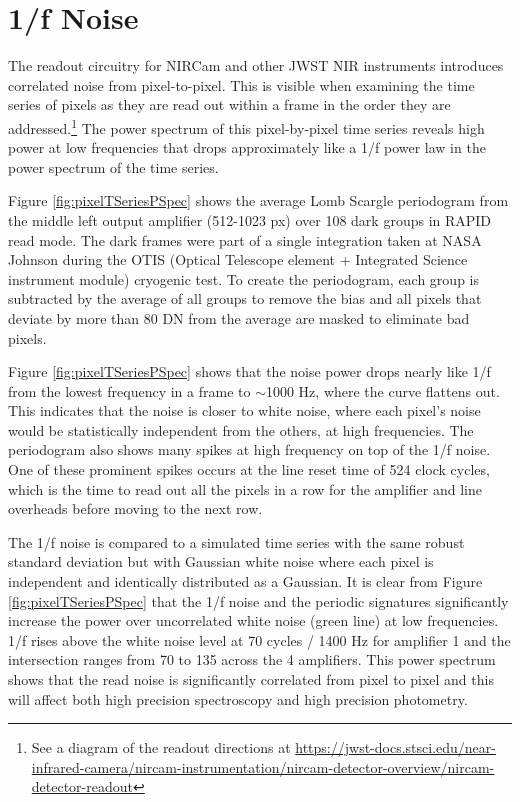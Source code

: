 \documentclass[]{aastex62}
\begin{document}
\section{1/f Noise}
The readout circuitry for NIRCam and other JWST NIR instruments introduces correlated noise from pixel-to-pixel.
This is visible when examining the time series of pixels as they are read out within a frame in the order they are addressed.\footnote{See a diagram of the readout directions at \url{https://jwst-docs.stsci.edu/near-infrared-camera/nircam-instrumentation/nircam-detector-overview/nircam-detector-readout}}
The power spectrum of this pixel-by-pixel time series reveals high power at low frequencies that drops approximately like a 1/f power law in the power spectrum of the time series.

Figure \ref{fig:pixelTSeriesPSpec} shows the average Lomb Scargle periodogram from the middle left output amplifier (512-1023 px) over 108 dark groups in RAPID read mode.
The dark frames were part of a single integration taken at NASA Johnson during the OTIS (Optical Telescope element + Integrated Science instrument module) cryogenic test.
To create the periodogram, each group is subtracted by the average of all groups to remove the bias and all pixels that deviate by more than 80 DN from the average are masked to eliminate bad pixels.

Figure \ref{fig:pixelTSeriesPSpec} shows that the noise power drops nearly like 1/f from the lowest frequency in a frame to $\sim$1000 Hz, where the curve flattens out.
This indicates that the noise is closer to white noise, where each pixel's noise would be statistically independent from the others, at high frequencies.
The periodogram also shows many spikes at high frequency on top of the 1/f noise.
One of these prominent spikes occurs at the line reset time of 524 clock cycles, which is the time to read out all the pixels in a row for the amplifier and line overheads before moving to the next row.

The 1/f noise is compared to a simulated time series with the same robust standard deviation but with Gaussian white noise where each pixel is independent and identically distributed as a Gaussian.
It is clear from Figure \ref{fig:pixelTSeriesPSpec} that the 1/f noise and the periodic signatures significantly increase the power over uncorrelated white noise (green line) at low frequencies.
1/f rises above the white noise level at 70 cycles / 1400 Hz for amplifier 1 and the intersection ranges from 70 to 135 across the 4 amplifiers.
This power spectrum shows that the read noise is significantly correlated from pixel to pixel and this will affect both high precision spectroscopy and high precision photometry.
\end{document}
